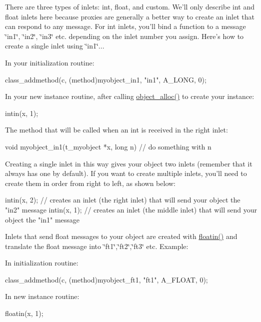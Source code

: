 There are three types of inlets: int, float, and custom. We'll only describe int and float inlets here because proxies are generally a better way to create an inlet that can respond to any message. For int inlets, you'll bind a function to a message \char`\"{}in1\char`\"{}, \char`\"{}in2\char`\"{}, \char`\"{}in3\char`\"{} etc. depending on the inlet number you assign. Here's how to create a single inlet using \char`\"{}in1\char`\"{}...

In your initialization routine: 
\begin{DoxyCode}
        class_addmethod(c, (method)myobject_in1, "in1", A_LONG, 0);
\end{DoxyCode}


In your new instance routine, after calling \hyperlink{group__obj_gacb89ef27c34b45e9037d877375804284}{object\_\-alloc()} to create your instance: 
\begin{DoxyCode}
        intin(x, 1);
\end{DoxyCode}


The method that will be called when an int is received in the right inlet: 
\begin{DoxyCode}
    void myobject_in1(t_myobject *x, long n)
    {
        // do something with n
    }
\end{DoxyCode}


Creating a single inlet in this way gives your object two inlets (remember that it always has one by default). If you want to create multiple inlets, you'll need to create them in order from right to left, as shown below: 
\begin{DoxyCode}
        intin(x, 2);        // creates an inlet (the right inlet) that will send 
      your object the "in2" message
        intin(x, 1);        // creates an inlet (the middle inlet) that will send
       your object the "in1" message
\end{DoxyCode}


Inlets that send float messages to your object are created with \hyperlink{group__inout_ga01125a22c75ef028199febbe21346f0e}{floatin()} and translate the float message into \char`\"{}ft1\char`\"{},\char`\"{}ft2\char`\"{},\char`\"{}ft3\char`\"{} etc. Example:

In initialization routine: 
\begin{DoxyCode}
        class_addmethod(c, (method)myobject_ft1, "ft1", A_FLOAT, 0);
\end{DoxyCode}


In new instance routine: 
\begin{DoxyCode}
        floatin(x, 1);
\end{DoxyCode}


